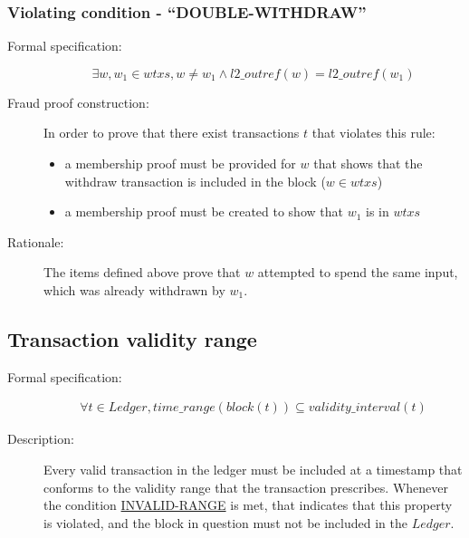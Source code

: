 \documentclass[../midgard.tex]{subfiles}
\begin{document}
\subsubsection{Violating condition - ``DOUBLE-WITHDRAW''}
\label{sec:DOUBLE-WITHDRAW}

\begin{description}

\item[Formal specification:]
\begin{equation*}
    \exists w, w_1 \in wtxs, w \neq w_1 \land l2\_outref(w) = l2\_outref(w_1)
\end{equation*}

\item[Fraud proof construction:] In order to prove that there exist transactions $t$ that violates this rule:
\begin{itemize}
    \item a membership proof must be provided for $w$ that shows that the withdraw transaction is included in the block ($w \in wtxs$)
    \item a membership proof must be created to show that $w_1$ is in $wtxs$
\end{itemize}

\item[Rationale:] The items defined above prove that $w$ attempted to spend the same input, which was already withdrawn by $w_1$.

\end{description}

\subsection{Transaction validity range}

\begin{description}

\item[Formal specification:]
\todo
\begin{equation*}
\begin{split}
    \forall t \in Ledger, time\_range(block(t)) \subseteq validity\_interval(t)
\end{split}
\end{equation*}

\item[Description:] Every valid transaction in the ledger must be included at a timestamp that conforms to the validity range that the transaction prescribes.
  Whenever the condition \hyperref[sec:INVALID-RANGE]{INVALID-RANGE} is met, that indicates that this property is violated, and the block in question must not be included in the $Ledger$.

\end{description}
\end{document}
